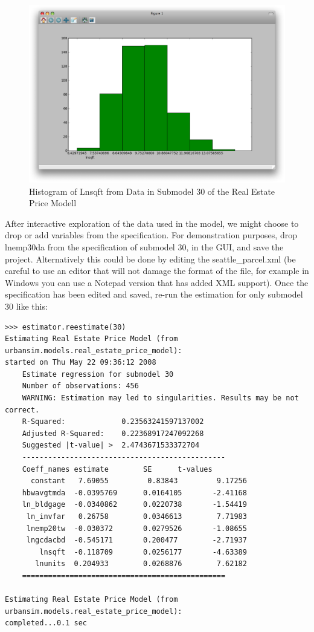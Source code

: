\begin{figure}[htp]
\begin{center}
\includegraphics[scale=0.35]{graphics/histogram-lnsqft.png}
\end{center}
\caption{Histogram of Lnsqft from Data in Submodel 30 of the Real Estate Price Modell}
\label{fig:histogram-lnsqft}
\end{figure}

After interactive exploration of the data used in the model,
we might choose to drop or add variables from the
specification.  For demonstration purposes, drop lnemp30da
from the specification of submodel 30, in the GUI, and save
the project.  Alternatively this could be done by editing
the seattle\_parcel.xml (be careful to use an editor that
will not damage the format of the file, for example in
Windows you can use a Notepad version that has added XML
support). Once the specification has been edited and saved,
re-run the estimation for only submodel 30 like this:
\\

\begin{verbatim}
>>> estimator.reestimate(30)
Estimating Real Estate Price Model (from urbansim.models.real_estate_price_model): 
started on Thu May 22 09:36:12 2008
    Estimate regression for submodel 30
    Number of observations: 456
    WARNING: Estimation may led to singularities. Results may be not correct.
    R-Squared:             0.23563241597137002
    Adjusted R-Squared:    0.22368917247092268
    Suggested |t-value| >  2.4743671533372704
    -----------------------------------------------
    Coeff_names estimate        SE      t-values
      constant   7.69055         0.83843         9.17256
    hbwavgtmda  -0.0395769      0.0164105       -2.41168
    ln_bldgage  -0.0340862      0.0220738       -1.54419
     ln_invfar   0.26758        0.0346613        7.71983
     lnemp20tw  -0.030372       0.0279526       -1.08655
     lngcdacbd  -0.545171       0.200477        -2.71937
        lnsqft  -0.118709       0.0256177       -4.63389
       lnunits  0.204933        0.0268876        7.62182
    ===============================================

Estimating Real Estate Price Model (from urbansim.models.real_estate_price_model): 
completed...0.1 sec
\end{verbatim}

